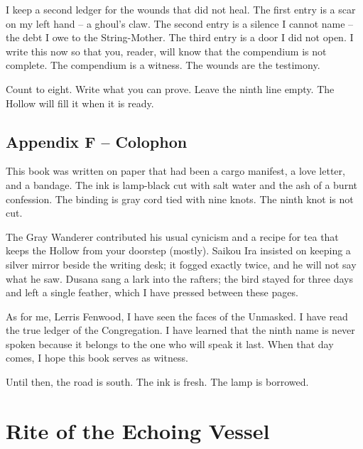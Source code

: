 I keep a second ledger for the wounds that did not heal. The first entry is a scar on my left hand -- a ghoul's claw. The second entry is a silence I cannot name -- the debt I owe to the String-Mother. The third entry is a door I did not open. I write this now so that you, reader, will know that the compendium is not complete. The compendium is a witness. The wounds are the testimony.

Count to eight. Write what you can prove. Leave the ninth line empty. The Hollow will fill it when it is ready.


\section*{Appendix F -- Colophon}

\noindent This book was written on paper that had been a cargo manifest, a love letter, and a bandage. The ink is lamp-black cut with salt water and the ash of a burnt confession. The binding is gray cord tied with nine knots. The ninth knot is not cut.

The Gray Wanderer contributed his usual cynicism and a recipe for tea that keeps the Hollow from your doorstep (mostly). Saikou Ira insisted on keeping a silver mirror beside the writing desk; it fogged exactly twice, and he will not say what he saw. Dusana sang a lark into the rafters; the bird stayed for three days and left a single feather, which I have pressed between these pages.

As for me, Lerris Fenwood, I have seen the faces of the Unmasked. I have read the true ledger of the Congregation. I have learned that the ninth name is never spoken because it belongs to the one who will speak it last. When that day comes, I hope this book serves as witness.

Until then, the road is south. The ink is fresh. The lamp is borrowed.


\cleardoublepage


\chapter{Rite of the Echoing Vessel}

